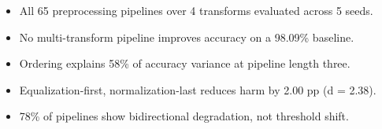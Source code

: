 
\begin{itemize}
    \item All 65 preprocessing pipelines over 4 transforms evaluated across 5 seeds.
    \item No multi-transform pipeline improves accuracy on a 98.09\% baseline.
    \item Ordering explains 58\% of accuracy variance at pipeline length three.
    \item Equalization-first, normalization-last reduces harm by 2.00 pp (d = 2.38).
    \item 78\% of pipelines show bidirectional degradation, not threshold shift.
\end{itemize}
